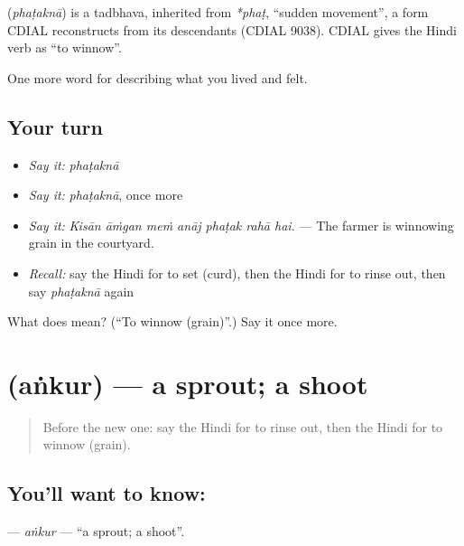 \begin{cousinweb}
\textbf{} (\emph{phaṭaknā}) is a tadbhava, inherited from \emph{*phaṭ}, \textquotedblleft{}sudden movement\textquotedblright{}, a form CDIAL reconstructs from its descendants (CDIAL 9038). CDIAL gives the Hindi verb as \textquotedblleft{}to winnow\textquotedblright{}.
\end{cousinweb}

\begin{grammarlens}[title={What you've built}]
One more word for describing what you lived and felt.
\end{grammarlens}

\subsection*{Your turn}
\begin{itemize}
\raggedright
  \item \emph{Say it:} \emph{phaṭaknā}
  \item \emph{Say it:} \emph{phaṭaknā}, once more
  \item \emph{Say it:} \emph{Kisān āṁgan meṁ anāj phaṭak rahā hai.} — The farmer is winnowing grain in the courtyard.
  \item \emph{Recall:} say the Hindi for to set (curd), then the Hindi for to rinse out, then say \emph{phaṭaknā} again
\end{itemize}

\begin{tcolorbox}[breakable,colback=teal!4,colframe=teal!35!black,title={Before you move on}]
What does  mean? (\textquotedblleft{}To winnow (grain)\textquotedblright{}.) Say it once more.
\end{tcolorbox}
\section[\texorpdfstring{\hi{अंकुर} (aṅkur)}{अंकुर (aṅkur)}]{ (aṅkur) — a sprout; a shoot}

\label{lesson:HI-C525-ankur}



\begin{quote}
Before the new one: say the Hindi for to rinse out, then the Hindi for to winnow (grain).
\end{quote}

\subsection*{You'll want to know: }
\textbf{} — \emph{aṅkur} — \textquotedblleft{}a sprout; a shoot\textquotedblright{}.

